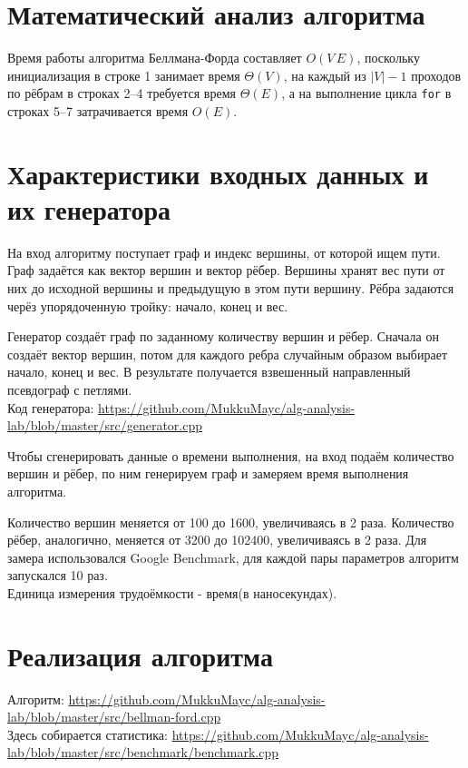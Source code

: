 \documentclass[a4paper,12pt]{article}
\begin{document}
\section{Математический анализ алгоритма}
  Время работы алгоритма Беллмана-Форда составляет $O(V\,E)$, поскольку
  инициализация в строке 1 занимает время $\Theta(V)$, на каждый из $|V| - 1$ 
  проходов по рёбрам в строках 2--4 требуется время $\Theta(E)$, а на выполнение цикла
  \texttt{for} в строках 5--7 затрачивается время $O(E)$.\cite[с.~689-690]{cormen}

\section{Характеристики входных данных и их генератора}
На вход алгоритму поступает граф и индекс вершины, от которой ищем пути.
Граф задаётся как вектор вершин и вектор рёбер.
Вершины хранят вес пути от них до исходной вершины и предыдущую в этом пути вершину.
Рёбра задаются черёз упорядоченную тройку: начало, конец и вес.

Генератор создаёт граф по заданному количеству вершин и рёбер.
Сначала он создаёт вектор вершин, потом для каждого ребра случайным образом 
выбирает начало, конец и вес.
В результате получается взвешенный направленный псевдограф с петлями. \\
Код генератора: \url{https://github.com/MukkuMayc/alg-analysis-lab/blob/master/src/generator.cpp}

Чтобы сгенерировать данные о времени выполнения, 
на вход подаём количество вершин и рёбер, по ним генерируем граф 
и замеряем время выполнения алгоритма.

Количество вершин меняется от 100 до 1600, увеличиваясь в 2 раза.
Количество рёбер, аналогично, меняется от 3200 до 102400, увеличиваясь в 2 раза.
Для замера использовался Google Benchmark, для каждой пары параметров 
алгоритм запускался 10 раз. \\
Единица измерения трудоёмкости - время(в наносекундах).
\section{Реализация алгоритма}
Алгоритм:
\url{https://github.com/MukkuMayc/alg-analysis-lab/blob/master/src/bellman-ford.cpp} \\
Здесь собирается статистика:
\url{https://github.com/MukkuMayc/alg-analysis-lab/blob/master/src/benchmark/benchmark.cpp}
\end{document}
